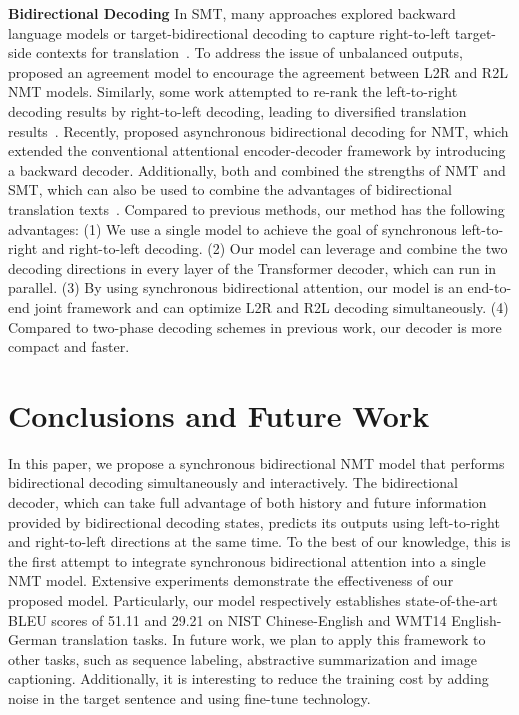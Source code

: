 \documentclass[11pt,a4paper]{article}
\begin{document}
\begin{CJK*}{UTF8}{gbsn}
\textbf{Bidirectional Decoding} In SMT, many approaches explored backward language models or target-bidirectional decoding to capture right-to-left target-side contexts for translation~\cite{C02-1050,D09-1117,N13-1002}. To address the issue of unbalanced outputs,  proposed an agreement model to encourage the agreement between L2R and R2L NMT models. Similarly, some work attempted to re-rank the left-to-right decoding results by right-to-left decoding, leading to diversified translation results~\cite{W16-2323,D17-1014,tan2017xmu,sennrich2017university,liu2018,W18-6408}.
Recently,  proposed asynchronous bidirectional decoding for NMT, which extended the conventional attentional encoder-decoder framework by introducing a backward decoder. Additionally, both  and  combined the strengths of NMT and SMT, which can also be used to combine the advantages of bidirectional translation texts~\cite{zhang2018asynchronous}.
Compared to previous methods, our method has the following advantages:
(1) We use a single model to achieve the goal of synchronous left-to-right and right-to-left decoding.
(2) Our model can leverage and combine the two decoding directions in every layer of the Transformer decoder, which can run in parallel.
(3) By using synchronous bidirectional attention, our model is an end-to-end joint framework and can optimize L2R and R2L decoding simultaneously.
(4) Compared to two-phase decoding schemes in previous work, our decoder is more compact and faster.

\section{Conclusions and Future Work}

In this paper, we propose a synchronous bidirectional NMT model that performs bidirectional decoding simultaneously and interactively.
The bidirectional decoder, which can take full advantage of both history and future information provided by bidirectional decoding states, predicts its outputs using left-to-right and right-to-left directions at the same time.
To the best of our knowledge, this is the first attempt to integrate synchronous bidirectional attention into a single NMT model.
Extensive experiments demonstrate the effectiveness of our proposed model.
Particularly, our model respectively establishes state-of-the-art BLEU scores of 51.11 and 29.21 on NIST Chinese-English and WMT14 English-German translation tasks.
In future work, we plan to apply this framework to other tasks, such as sequence labeling, abstractive summarization and image captioning.
Additionally, it is interesting to reduce the training cost by adding noise in the target sentence and using fine-tune technology.


\end{CJK*}
\end{document}
